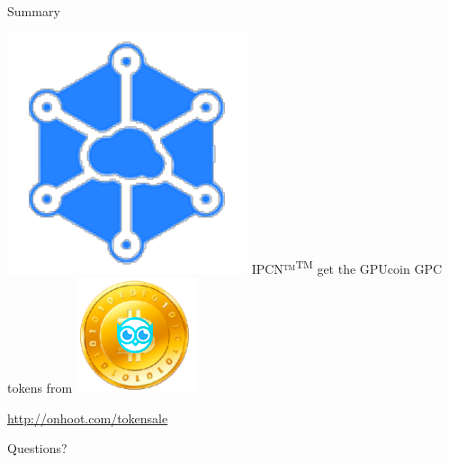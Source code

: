 \documentclass[10pt,handout]{beamer}
\begin{document}
\begin{frame}{Summary}

\includegraphics[scale=.4]{static/ipcn-p2p}
IPCN™\textsuperscript{TM} get the GPUcoin GPC tokens from
\includegraphics[scale=0.4]{static/hootcoin} 
 \begin{center}\url{http://onhoot.com/tokensale}\end{center}




 \begin{center}\ccbysa\end{center}

\end{frame}
\begin{frame}[standout]
 Questions?
\end{frame}
\end{document}
